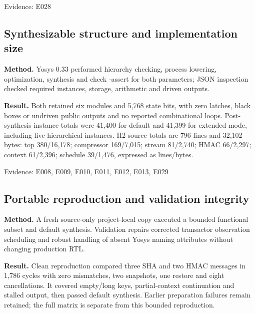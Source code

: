 \documentclass[11pt,a4paper]{article}
\begin{document}
{\small Evidence: E028}

\subsection{Synthesizable structure and implementation size}

\textbf{Method.} Yosys 0.33 performed hierarchy checking,\allowbreak{} process lowering,\allowbreak{} optimization,\allowbreak{} synthesis and check -assert for both parameters; JSON inspection checked required instances,\allowbreak{} storage,\allowbreak{} arithmetic and driven outputs.

\textbf{Result.} Both retained six modules and 5,\allowbreak{}768 state bits,\allowbreak{} with zero latches,\allowbreak{} black boxes or undriven public outputs and no reported combinational loops. Post-synthesis instance totals were 41,\allowbreak{}400 for default and 41,\allowbreak{}399 for extended mode,\allowbreak{} including five hierarchical instances. H2 source totals are 796 lines and 32,\allowbreak{}102 bytes: top 380/\allowbreak{}16,\allowbreak{}178; compressor 169/\allowbreak{}7,\allowbreak{}015; stream 81/\allowbreak{}2,\allowbreak{}740; HMAC 66/\allowbreak{}2,\allowbreak{}297; context 61/\allowbreak{}2,\allowbreak{}396; schedule 39/\allowbreak{}1,\allowbreak{}476,\allowbreak{} expressed as lines/\allowbreak{}bytes.

{\small Evidence: E008,\allowbreak{} E009,\allowbreak{} E010,\allowbreak{} E011,\allowbreak{} E012,\allowbreak{} E013,\allowbreak{} E029}

\subsection{Portable reproduction and validation integrity}

\textbf{Method.} A fresh source-only project-local copy executed a bounded functional subset and default synthesis. Validation repairs corrected transactor observation scheduling and robust handling of absent Yosys naming attributes without changing production RTL.

\textbf{Result.} Clean reproduction compared three SHA and two HMAC messages in 1,\allowbreak{}786 cycles with zero mismatches,\allowbreak{} two snapshots,\allowbreak{} one restore and eight cancellations. It covered empty/\allowbreak{}long keys,\allowbreak{} partial-context continuation and stalled output,\allowbreak{} then passed default synthesis. Earlier preparation failures remain retained; the full matrix is separate from this bounded reproduction.
\end{document}
